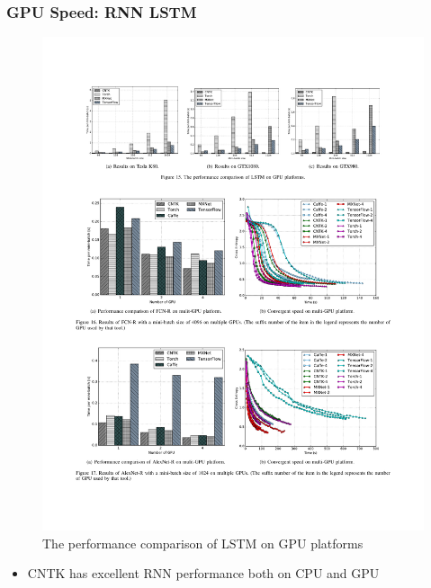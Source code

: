 \begin{frame}
	\MyLogo
	\frametitle{GPU Speed: RNN LSTM}
	
	\begin{figure}[htbp] 
		\includegraphics[width=\linewidth]{figures/LSTM2.pdf} 
		\caption{The performance comparison of LSTM on GPU platforms}
	\end{figure}

\vskip -10pt
\begin{mdframed}[style=mystyle1]
\begin{itemize}
\item CNTK has excellent RNN performance both on CPU and GPU
\end{itemize}
\end{mdframed}
	
\end{frame}


